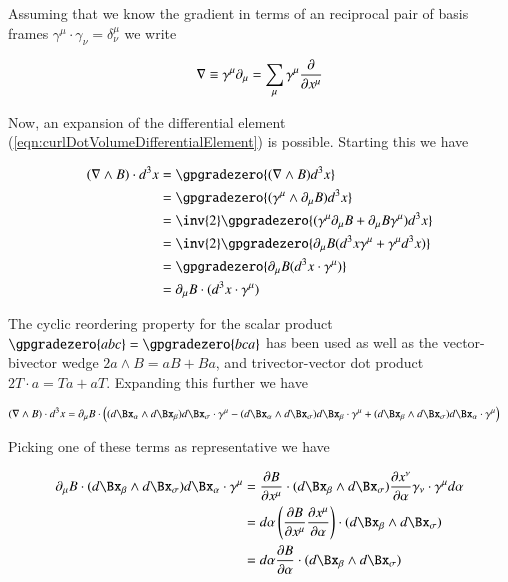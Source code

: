 Assuming that we know the gradient in terms of an reciprocal pair of basis frames $\gamma^\mu \cdot \gamma_\nu = \delta^\mu_\nu$ we write

\begin{align}\label{eqn:gradientDefined}
\nabla \equiv \gamma^\mu \partial_\mu = \sum_\mu \gamma^\mu \frac{\partial {}}{\partial {x^\mu}}
\end{align}

Now, an expansion of the differential element (\ref{eqn:curlDotVolumeDifferentialElement}) is possible.  Starting this we have

\begin{align*}
(\grad \wedge B) \cdot d^3 x
&=
\gpgradezero{ (\grad \wedge B) d^3 x } \\
&=
\gpgradezero{ (\gamma^\mu \wedge \partial_\mu B) d^3 x } \\
&=
\inv{2} \gpgradezero{ (\gamma^\mu \partial_\mu B + \partial_\mu B \gamma^\mu) d^3 x } \\
&=
\inv{2} \gpgradezero{ \partial_\mu B (d^3 x \gamma^\mu + \gamma^\mu d^3 x) } \\
&=
\gpgradezero{ \partial_\mu B (d^3 x \cdot \gamma^\mu) } \\
&=
\partial_\mu B \cdot (d^3 x \cdot \gamma^\mu)
\end{align*}

The cyclic reordering property for the scalar product $\gpgradezero{a b c} = \gpgradezero{ b c a}$ has been used as well as the vector-bivector wedge $2 a \wedge B = a B + B a$, and trivector-vector dot product $2 T \cdot a = T a + a T$.  Expanding this further we have

\begin{align*}
(\grad \wedge B) \cdot d^3 x
&=
\partial_\mu B \cdot \left(
 (d\Bx_\alpha \wedge d\Bx_\beta) d\Bx_\sigma \cdot \gamma^\mu
-(d\Bx_\alpha \wedge d\Bx_\sigma) d\Bx_\beta \cdot \gamma^\mu
+(d\Bx_\beta  \wedge d\Bx_\sigma) d\Bx_\alpha \cdot \gamma^\mu
\right)
\end{align*}

Picking one of these terms as representative we have

\begin{align*}
\partial_\mu B \cdot (d\Bx_\beta \wedge d\Bx_\sigma) d\Bx_\alpha \cdot \gamma^\mu
&=
\PD{x^\mu}{B} \cdot (d\Bx_\beta \wedge d\Bx_\sigma) \PD{\alpha}{x^\nu} \gamma_\nu \cdot \gamma^\mu d\alpha \\
&=
d\alpha \left( \PD{x^\mu}{B} \PD{\alpha}{x^\mu} \right) \cdot (d\Bx_\beta \wedge d\Bx_\sigma) \\
&=
d\alpha \PD{\alpha}{B} \cdot (d\Bx_\beta \wedge d\Bx_\sigma) \\
\end{align*}

